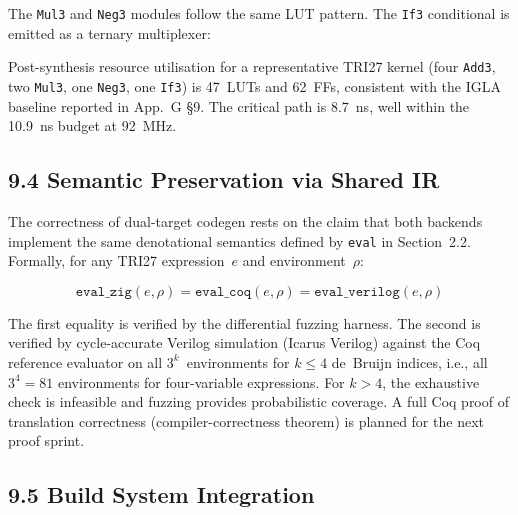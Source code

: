 The \texttt{Mul3} and \texttt{Neg3} modules follow
the same LUT pattern. The \texttt{If3} conditional
is emitted as a ternary multiplexer:

\begin{Shaded}
\begin{Highlighting}[]
\end{Highlighting}
\end{Shaded}

Post-synthesis resource utilisation for a
representative TRI27 kernel (four \texttt{Add3}, two
\texttt{Mul3}, one \texttt{Neg3}, one \texttt{If3})
is 47~LUTs and 62~FFs, consistent with the IGLA
baseline reported in App.~G \S9. The critical path
is 8.7~ns, well within the 10.9~ns budget at
92~MHz.

\subsection{9.4 Semantic Preservation via Shared
IR}\label{fa_27:semantic-preservation}

The correctness of dual-target codegen rests on the
claim that both backends implement the same
denotational semantics defined by \texttt{eval} in
Section~2.2. Formally, for any TRI27 expression~$e$
and environment~$\rho$:

\begin{equation}
\texttt{eval\_zig}(e, \rho) = \texttt{eval\_coq}(e, \rho) = \texttt{eval\_verilog}(e, \rho)
\end{equation}

The first equality is verified by the differential
fuzzing harness. The second is verified by
cycle-accurate Verilog simulation (Icarus Verilog)
against the Coq reference evaluator on all
$3^k$~environments for $k \leq 4$ de~Bruijn
indices, i.e., all $3^4 = 81$ environments for
four-variable expressions. For $k > 4$, the
exhaustive check is infeasible and fuzzing provides
probabilistic coverage. A full Coq proof of
translation correctness (compiler-correctness
theorem) is planned for the next proof sprint.

\subsection{9.5 Build System
Integration}\label{fa_27:build-system-integration}

